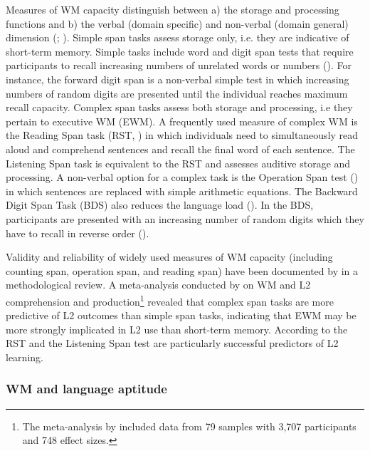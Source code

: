 \documentclass[output=paper]{langscibook}
\begin{document}
Measures of WM capacity distinguish between a) the storage and processing functions and b) the verbal (domain specific) and non-verbal (domain general) dimension (\citealt{LinckEtAl2014}; \citealt{Wen2015}). Simple span tasks assess storage only, i.e. they are indicative of short-term memory. Simple tasks include word and digit span tests that require participants to recall increasing numbers of unrelated words or numbers (\citealt{JuffsHarrington2011}). For instance, the forward digit span is a non-verbal simple test in which increasing numbers of random digits are presented until the individual reaches maximum recall capacity. Complex span tasks assess both storage and processing, i.e they pertain to executive WM (EWM). A frequently used measure of complex WM is the Reading Span task (RST, \citealt{DanemanCarpenter1980}) in which individuals need to simultaneously read aloud and comprehend sentences and recall the final word of each sentence. The Listening Span task is equivalent to the RST and assesses auditive storage and processing. A non-verbal option for a complex task is the Operation Span test (\citealt{TurnerEngle1989}) in which sentences are replaced with simple arithmetic equations. The Backward Digit Span Task (BDS) also reduces the language load (\citealt{KormosSafar2008}). In the BDS, participants are presented with an increasing number of random digits which they have to recall in reverse order (\citealt{JuffsHarrington2011}). 

Validity and reliability of widely used measures of WM capacity (including counting span, operation span, and reading span) have been documented by \citet{ConwayEtAl2005} in a methodological review. A meta-analysis conducted by \citet[861]{LinckEtAl2014} on WM and L2 comprehension and production\footnote{The meta-analysis by \citet{LinckEtAl2014} included data from 79 samples with 3,707 participants and 748 effect sizes.} revealed that complex span tasks are more predictive of L2 outcomes than simple span tasks, indicating that EWM may be more strongly implicated in L2 use than short-term memory. According to \citet[158]{JuffsHarrington2011} the RST and the Listening Span test are particularly successful predictors of L2 learning.

\subsubsection{WM and language aptitude} %
\end{document}
